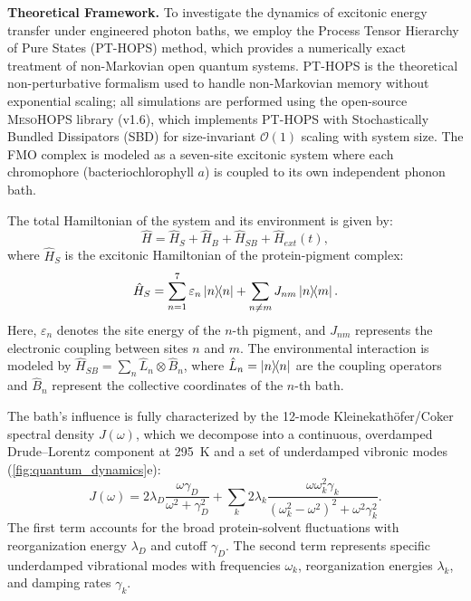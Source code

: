 \documentclass[journal=jpcl,manuscript=letter]{achemso}
\begin{document}
\textbf{Theoretical Framework.}
To investigate the dynamics of excitonic energy transfer under engineered photon baths, we employ the Process Tensor Hierarchy of Pure States (PT-HOPS) method,\cite{Suess2014,Citty2024a} which provides a numerically exact treatment of non-Markovian open quantum systems. PT-HOPS is the theoretical non-perturbative formalism used to handle non-Markovian memory without exponential scaling; all simulations are performed using the open-source \textsc{MesoHOPS} library (v1.6),\cite{Varvelo2021a} which implements PT-HOPS with Stochastically Bundled Dissipators (SBD) for size-invariant $\mathcal{O}(1)$ scaling with system size. The FMO complex is modeled as a seven-site excitonic system where each chromophore (bacteriochlorophyll $a$) is coupled to its own independent phonon bath.

The total Hamiltonian of the system and its environment is given by:
\begin{equation}
\hat{H} = \hat{H}_S + \hat{H}_B + \hat{H}_{SB} + \hat{H}_{ext}(t),
\label{eq:total_hamiltonian}
\end{equation}
where $\hat{H}_S$ is the excitonic Hamiltonian of the protein-pigment complex:
\begin{equation}
\hat{H}_S = \sum_{n=1}^{7} \varepsilon_n \dyad{n} + \sum_{n \neq m} J_{nm} \dyad{n}{m}.
\label{eq:excitonic_hamiltonian}
\end{equation}
Here, $\varepsilon_n$ denotes the site energy of the $n$-th pigment, and $J_{nm}$ represents the electronic coupling between sites $n$ and $m$. The environmental interaction is modeled by $\hat{H}_{SB} = \sum_n \hat{L}_n \otimes \hat{B}_n$, where $\hat{L}_n = \dyad{n}$ are the coupling operators and $\hat{B}_n$ represent the collective coordinates of the $n$-th bath.

The bath's influence is fully characterized by the 12-mode Kleinekathöfer/Coker spectral density $J(\omega)$, which we decompose into a continuous, overdamped Drude--Lorentz component at \SI{295}{\kelvin} and a set of underdamped vibronic modes (\cref{fig:quantum_dynamics}e):
\begin{equation}
J(\omega) = 2\lambda_D \frac{\omega \gamma_D}{\omega^2 + \gamma_D^2} + \sum_{k} 2\lambda_k \frac{\omega \omega_k^2 \gamma_k}{(\omega_k^2 - \omega^2)^2 + \omega^2 \gamma_k^2}.
\label{eq:spectral_density}
\end{equation}
The first term accounts for the broad protein-solvent fluctuations with reorganization energy $\lambda_D$ and cutoff $\gamma_D$. The second term represents specific underdamped vibrational modes with frequencies $\omega_k$, reorganization energies $\lambda_k$, and damping rates $\gamma_k$.
\end{document}
